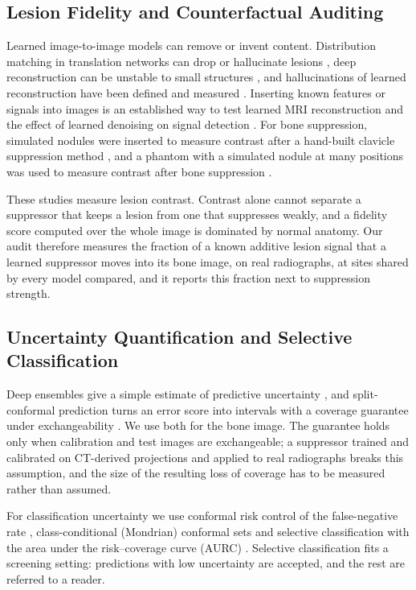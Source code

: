 \subsection{Lesion Fidelity and Counterfactual Auditing}
\label{sec:rw-fidelity}
Learned image-to-image models can remove or invent content. Distribution matching in translation networks can drop or hallucinate lesions
\cite{cohen2018distribution}, deep reconstruction can be unstable to small structures \cite{antun2020instabilities}, and hallucinations of
learned reconstruction have been defined and measured \cite{bhadra2021hallucinations,tivnan2024hallucination}. Inserting known features
or signals into images is an established way to test learned MRI reconstruction \cite{cheng2020addressing} and the effect of learned
denoising on signal detection \cite{li2021assessing}. For bone suppression, simulated nodules were inserted to measure contrast after a
hand-built clavicle suppression method \cite{hogeweg2013suppression}, and a phantom with a simulated nodule at many positions was used to
measure contrast after bone suppression \cite{takagi2020dose}.

These studies measure lesion contrast. Contrast alone cannot separate a suppressor that keeps a lesion from one that suppresses weakly,
and a fidelity score computed over the whole image is dominated by normal anatomy. Our audit therefore measures the fraction of a known
additive lesion signal that a learned suppressor moves into its bone image, on real radiographs, at sites shared by every model compared,
and it reports this fraction next to suppression strength.

\subsection{Uncertainty Quantification and Selective Classification}
\label{sec:rw-uq}
Deep ensembles give a simple estimate of predictive uncertainty \cite{lakshminarayanan2017ensembles}, and split-conformal prediction turns
an error score into intervals with a coverage guarantee under exchangeability \cite{lei2018conformal,angelopoulos2023conformal}. We use
both for the bone image. The guarantee holds only when calibration and test images are exchangeable; a suppressor trained and calibrated
on CT-derived projections and applied to real radiographs breaks this assumption, and the size of the resulting loss of coverage has to be
measured rather than assumed.

For classification uncertainty we use conformal risk control of the false-negative rate \cite{angelopoulos2022crc}, class-conditional
(Mondrian) conformal sets \cite{vovk2005algorithmic} and selective classification with the area under the risk--coverage curve (AURC)
\cite{geifman2017selective,geifman2019bias}. Selective classification fits a screening setting: predictions with low uncertainty are
accepted, and the rest are referred to a reader.

